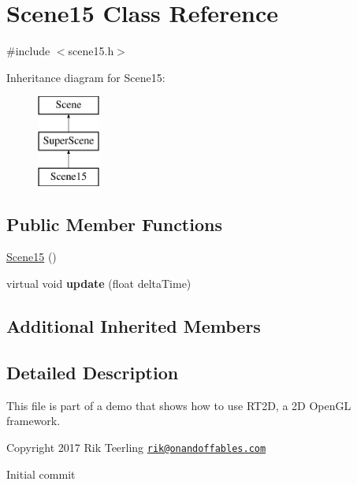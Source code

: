 \hypertarget{class_scene15}{}\section{Scene15 Class Reference}
\label{class_scene15}


{\ttfamily \#include $<$scene15.\+h$>$}

Inheritance diagram for Scene15\+:\begin{figure}[H]
\begin{center}
\leavevmode
\includegraphics[height=3.000000cm]{class_scene15}
\end{center}
\end{figure}
\subsection*{Public Member Functions}
\begin{DoxyCompactItemize}
\item 
\hyperlink{class_scene15_aadba8e1ea9c1ab830e52be6d56cb5fea}{Scene15} ()
\item 
\mbox{\label{class_scene15_a2d55c7e4ba97e1504d7e3e32ae680d5f}} 
virtual void {\bfseries update} (float delta\+Time)
\end{DoxyCompactItemize}
\subsection*{Additional Inherited Members}


\subsection{Detailed Description}
This file is part of a demo that shows how to use R\+T2D, a 2D Open\+GL framework.


\begin{DoxyItemize}
\item Copyright 2017 Rik Teerling \href{mailto:rik@onandoffables.com}{\tt rik@onandoffables.\+com}
\begin{DoxyItemize}
\item Initial commit 
\end{DoxyItemize}
\end{DoxyItemize}

